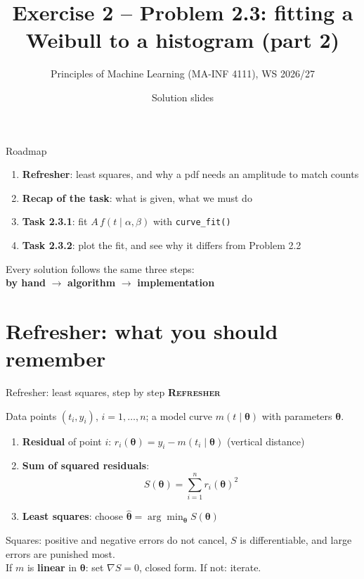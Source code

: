 \documentclass[aspectratio=169,11pt]{beamer}
\title{Exercise 2 -- Problem 2.3: fitting a Weibull to a histogram (part 2)}
\subtitle{Principles of Machine Learning (MA-INF 4111), WS 2026/27}
\date{Solution slides}
\newcommand{\stage}[2]{{\color{#1}\bfseries\small\textsc{#2}}\par\smallskip}
\newcommand{\Refresh}{\stage{given}{Refresher}}
\begin{document}
\maketitle

\begin{frame}{Roadmap}
\begin{enumerate}
\item \textbf{Refresher}: least squares, and why a pdf needs an amplitude to match counts
\item \textbf{Recap of the task}: what is given, what we must do
\item \textbf{Task 2.3.1}: fit $A\,f(t\mid\alpha,\beta)$ with \texttt{curve\_fit()}
\item \textbf{Task 2.3.2}: plot the fit, and see why it differs from Problem 2.2
\end{enumerate}
\bigskip
Every solution follows the same three steps:\\[3pt]
\textcolor{hand}{\textbf{by hand}} \;$\to$\; \textcolor{algo}{\textbf{algorithm}} \;$\to$\; \textcolor{impl}{\textbf{implementation}}
\end{frame}

\section{Refresher: what you should remember}

\begin{frame}{Refresher: least squares, step by step}
\Refresh
Data points $(t_i,y_i)$, $i=1,\dots,n$; a model curve $m(t\mid\bm\theta)$ with parameters $\bm\theta$.
\begin{enumerate}
\item \textbf{Residual} of point $i$: \quad $r_i(\bm\theta)=y_i-m(t_i\mid\bm\theta)$ \quad (vertical distance)
\item \textbf{Sum of squared residuals}:
\[S(\bm\theta)=\sum_{i=1}^n r_i(\bm\theta)^2\]
\item \textbf{Least squares}: choose $\hat{\bm\theta}=\arg\min_{\bm\theta} S(\bm\theta)$
\end{enumerate}
\medskip
Squares: positive and negative errors do not cancel, $S$ is differentiable, and large errors are punished most.\\
If $m$ is \textbf{linear} in $\bm\theta$: set $\nabla S=0$, closed form. If not: iterate.
\end{frame}
\end{document}
